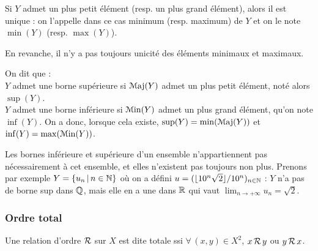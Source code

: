 			\begin{Propriete}
				Si \(Y\) admet un plus petit élément (resp.\! un plus grand élément), alors il est unique : on l'appelle dans ce cas minimum (resp.\! maximum) de \(Y\) et on le note \(\min(Y)\) (resp.\! \(\max(Y)\)).
			\end{Propriete}
			
			\begin{Remarque}
				En revanche, il n'y a pas toujours unicité des éléments minimaux et maximaux.
			\end{Remarque}
			
			\begin{Definition}
				On dit que : \\
				 \bdot \(Y\) admet une borne supérieure si \(\Maj(Y)\) admet un plus petit élément, noté alors \(\sup(Y)\). \\
				 \bdot \(Y\) admet une borne inférieure si \(\Min(Y)\) admet un plus grand élément, qu'on note \(\inf(Y)\). \nt
				On a donc, lorsque cela existe, \(\sup(Y) = \min(\Maj(Y))\) et \(\inf(Y) = \max(\Min(Y))\).
			\end{Definition}
			
			\begin{Remarque}
				Les bornes inférieure et supérieure d'un ensemble n'appartiennent pas nécessairement à cet ensemble, et elles n'existent pas toujours non plus. Prenons par exemple \(Y = \{u_n\,|\,n\in\bb{N}\}\) où on a défini \(u = (\lfloor 10^n\sqrt{2}\rfloor/10^n)_{n\in\bb{N}}\) : \(Y\) n'a pas de borne sup dans \(\bb{Q}\), mais elle en a une dans \(\bb{R}\) qui vaut \(\lim_{n\to+\infty} u_n = \sqrt{2}\).
			\end{Remarque}
			
		\subsubsection{Ordre total}
		
			\begin{Definition}
				Une relation d'ordre \(\cal{R}\) sur \(X\) est dite totale ssi \(\forall \,(x,y) \in X^2\), \(x \,\cal{R}\, y\) ou \(y \,\cal{R}\, x\).
			\end{Definition}
			
